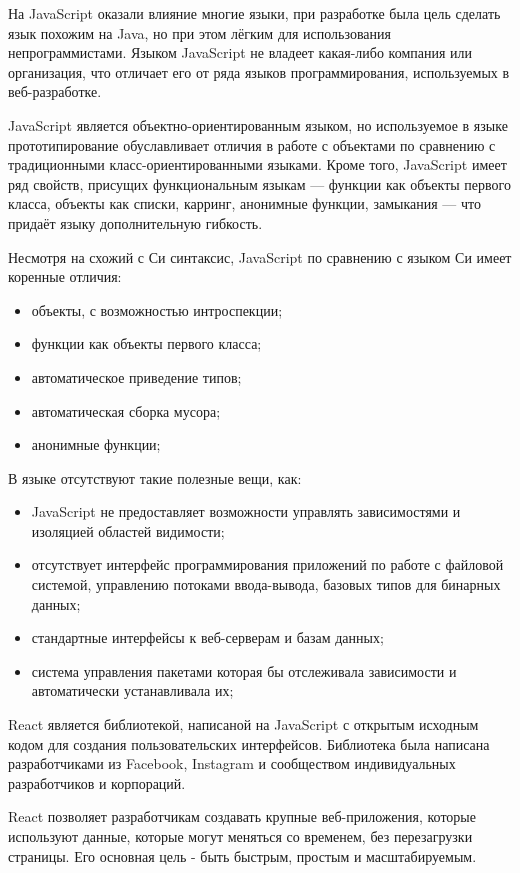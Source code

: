 На JavaScript оказали влияние многие языки, при разработке была цель сделать язык похожим на Java, но при этом лёгким для использования непрограммистами. Языком JavaScript не владеет какая-либо компания или организация, что отличает его от ряда языков программирования, используемых в веб-разработке.

JavaScript является объектно-ориентированным языком, но используемое в языке прототипирование обуславливает отличия в работе с объектами по сравнению с традиционными класс-ориентированными языками. Кроме того, JavaScript имеет ряд свойств, присущих функциональным языкам — функции как объекты первого класса, объекты как списки, карринг, анонимные функции, замыкания — что придаёт языку дополнительную гибкость.

Несмотря на схожий с Си синтаксис, JavaScript по сравнению с языком Си имеет коренные отличия:

\begin{itemize}
	\item объекты, с возможностью интроспекции;
	\item функции как объекты первого класса;
	\item автоматическое приведение типов;
	\item автоматическая сборка мусора;
	\item анонимные функции;
\end{itemize}

В языке отсутствуют такие полезные вещи, как:

\begin{itemize}
	\item JavaScript не предоставляет возможности управлять зависимостями и изоляцией областей видимости;
	\item отсутствует интерфейс программирования приложений по работе с файловой системой, управлению потоками ввода-вывода, базовых типов для бинарных данных;
	\item стандартные интерфейсы к веб-серверам и базам данных;
	\item система управления пакетами которая бы отслеживала зависимости и автоматически устанавливала их;
\end{itemize}

React является библиотекой, написаной на JavaScript с открытым исходным кодом для создания пользовательских интерфейсов. Библиотека была написана разработчиками из Facebook, Instagram и сообществом индивидуальных разработчиков и корпораций. 

React позволяет разработчикам создавать крупные веб-приложения, которые используют данные, которые могут меняться со временем, без перезагрузки страницы. Его основная цель - быть быстрым, простым и масштабируемым. 


